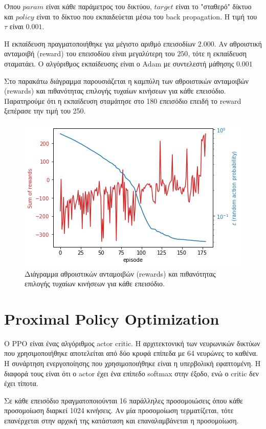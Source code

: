 \documentclass[a4paper]{article}
\begin{document}
Όπου $param$ είναι κάθε παράμετρος του δικτύου, $target$ είναι το "σταθερό"
δίκτυο και $policy$ είναι το δίκτυο που εκπαιδεύεται μέσω του back propagation.
Η τιμή του $\tau$ είναι $0.001$.

Η εκπαίδευση πραγματοποιήθηκε για μέγιστο αριθμό επεισοδίων $2.000$. Αν
αθροιστική ανταμοιβή (reward) του επεισοδίου είναι μεγαλύτερη του $250$, τότε η
εκπαίδευση σταματάει. Ο αλγόριθμος εκπαίδευσης είναι ο Adam με συντελεστή
μάθησης $0.001$

Στο παρακάτω διάγραμμα παρουσιάζεται η καμπύλη των αθροιστικών ανταμοιβών
(rewards) και πιθανότητας επιλογής τυχαίων κινήσεων για κάθε επεισόδιο.
Παρατηρούμε ότι η εκπαίδευση σταμάτησε στο 180 επεισόδιο επειδή το reward
ξεπέρασε την τιμή του 250.

\begin{figure}[H]
    \centering

    \includegraphics[width=.8\linewidth]{dqn_reward_epsilon.png}

    \caption{Διάγραμμα αθροιστικών ανταμοιβών (rewards) και πιθανότητας επιλογής
    τυχαίων κινήσεων για κάθε επεισόδιο.}
\end{figure}


\section{Proximal Policy Optimization}

Ο PPO είναι ένας αλγόριθμος actor critic. Η αρχιτεκτονική των νευρωνικών δικτύων
που χρησιμοποιήθηκε αποτελείται από δύο κρυφά επίπεδα με 64 νευρώνες το καθένα.
Η συνάρτηση ενεργοποίησης που χρησιμοποιήθηκε είναι η υπερβολική εφαπτομένη. Η
διαφορά τους είναι ότι ο actor έχει ένα επίπεδο softmax στην έξοδο, ενώ ο critic
δεν έχει τίποτα.

Σε κάθε επεισόδιο πραγματοποιούνται 16 παράλληλες προσομοιώσεις όπου κάθε
προσομοίωση διαρκεί 1024 κινήσεις. Αν μία προσομοίωση τερματίζεται, τότε
επανέρχεται στην αρχική της κατάσταση και επαναλαμβάνεται η προσομοίωση.
\end{document}
